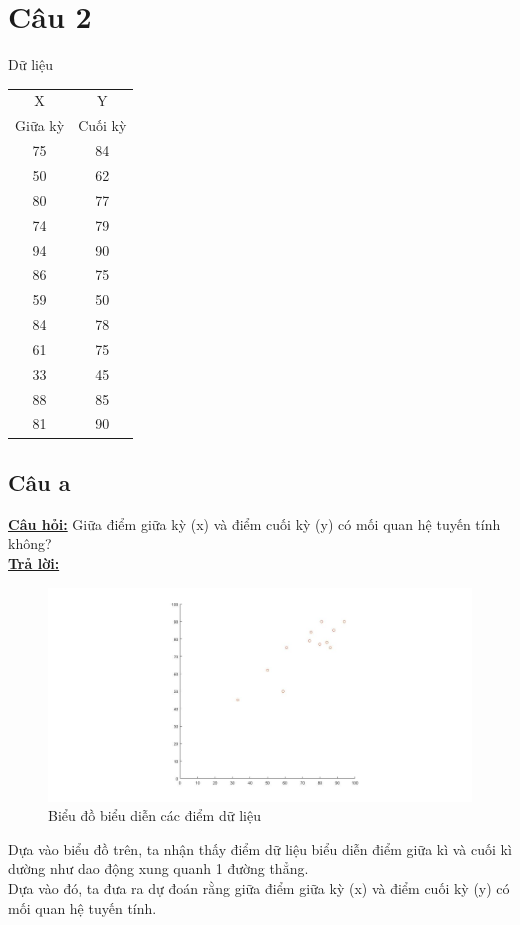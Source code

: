 \documentclass[a4paper 14pt]{extarticle}
\begin{document}
	\section{Câu 2}
		Dữ liệu\\
		\begin{tabular}{c | c}
			X & Y\\
			Giữa kỳ&Cuối kỳ\\
			\hline
			75 & 84\\
			50 & 62\\
			80 & 77\\
			74 & 79\\
			94 & 90\\
			86 & 75\\
			59 & 50\\
			84 & 78\\
			61 & 75\\
			33 & 45\\
			88 & 85\\
			81 & 90\\
		\end{tabular}
		\subsection{Câu a}
			\underline{\textbf{Câu hỏi:}} Giữa điểm giữa kỳ (x) và điểm cuối kỳ (y) có mối quan hệ tuyến tính không?\\
			\underline{\textbf{Trả lời:}}\\
			\begin{figure}[H]
				\includegraphics[scale = 0.3]{datapoint}
				\caption{Biểu đồ biểu diễn các điểm dữ liệu}
			\end{figure}
			Dựa vào biểu đồ trên, ta nhận thấy điểm dữ liệu biểu diễn điểm giữa kì và cuối kì dường như dao động xung quanh 1 đường thẳng.\\
			Dựa vào đó, ta đưa ra dự đoán rằng giữa điểm giữa kỳ (x) và điểm cuối kỳ (y) có mối quan hệ tuyến tính.
\end{document}
